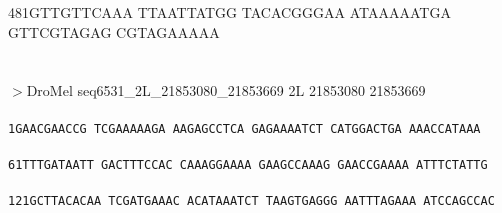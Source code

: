 \documentclass[11pt,twoside,reqno,a4paper]{article}
\begin{document}
{481\hspace*{1\charwidth}GTTGTTCAAA	TTAATTATGG	TACACGGGAA	ATAAAAATGA	GTTCGTAGAG	CGTAGAAAAA	\\
\hspace*{4\charwidth}\hspace*{1\charwidth}\hspace*{1\charwidth}\hspace*{1\charwidth}\hspace*{1\charwidth}\hspace*{1\charwidth}\hspace*{1\charwidth}\\
}
\\
$>$DroMel	seq6531\_2L\_21853080\_21853669	2L	21853080	21853669 \\
 \\
\texttt{1\hspace*{3\charwidth}GAACGAACCG	TCGAAAAAGA	AAGAGCCTCA	GAGAAAATCT	CATGGACTGA	AAACCATAAA	\\
\hspace*{4\charwidth}\hspace*{1\charwidth}\hspace*{1\charwidth}\hspace*{1\charwidth}\hspace*{1\charwidth}\hspace*{1\charwidth}\hspace*{1\charwidth}\\
61\hspace*{2\charwidth}TTTGATAATT	GACTTTCCAC	CAAAGGAAAA	GAAGCCAAAG	GAACCGAAAA	ATTTCTATTG	\\
\hspace*{4\charwidth}\hspace*{1\charwidth}\hspace*{1\charwidth}\hspace*{1\charwidth}\hspace*{1\charwidth}\hspace*{1\charwidth}\hspace*{1\charwidth}\\
121\hspace*{1\charwidth}GCTTACACAA	TCGATGAAAC	ACATAAATCT	TAAGTGAGGG	AATTTAGAAA	ATCCAGCCAC	\\
\hspace*{4\charwidth}\hspace*{1\charwidth}\hspace*{1\charwidth}\hspace*{1\charwidth}\hspace*{1\charwidth}\hspace*{1\charwidth}\hspace*{1\charwidth}\\
}
\end{document}

